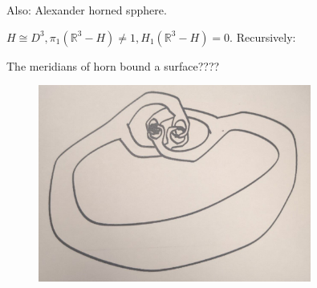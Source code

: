 \documentclass{article}
\theoremstyle{definition}
\begin{document}
    Also: Alexander horned spphere.

    \(H \cong D^3, \pi_1(\mathbb{R}^3 - H) \neq 1, H_1(\mathbb{R}^3 - H) = 0\). Recursively:

    The meridians of horn bound a surface????

    \begin{figure}[H]
        \centering
        \includegraphics[width=0.8\textwidth]{img/horn}
    \end{figure}
\end{document}
